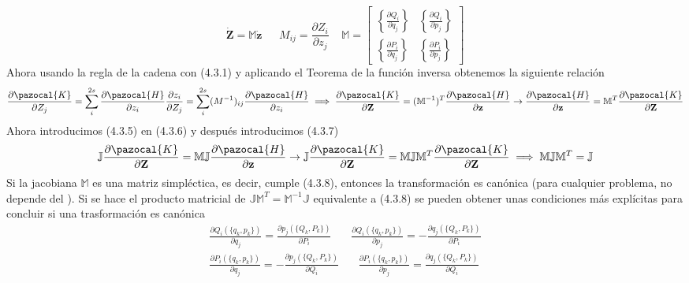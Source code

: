 \begin{equation} \label{4.2.7}
    \dot{\mathbf{Z}} = \mathbb{M}\dot{\mathbf{z}}  \ \ \ \ \ \ \ M_{ij} = \frac{\partial Z_i}{\partial z_j} \ \ \ \ \ \mathbb{M} = \left[\begin{array}{cc} \left\{\frac{\partial Q_i}{\partial q_j}\right\} & \left\{\frac{\partial Q_i}{\partial p_j}\right\} \\  \left\{\frac{\partial P_i}{\partial q_j}\right\} & \left\{\frac{\partial P_i}{\partial p_j}\right\} \end{array}\right]
\end{equation} 
Ahora usando la regla de la cadena con (4.3.1) y aplicando el Teorema de la función inversa obtenemos la siguiente relación 
\begin{equation} \label{4.2.7}
    \frac{\partial \pazocal{K}}{\partial Z_j} = \sum_i^{2s} \frac{\partial \pazocal{H}}{\partial z_i} \frac{\partial z_i}{\partial Z_j} = \sum_i^{2s} ({M^{-1}})_{ij} \frac{\partial \pazocal{H}}{\partial z_i} \implies \frac{\partial \pazocal{K}}{\partial \mathbf{Z}} = (\mathbb{M}^{-1})^T \frac{\partial \pazocal{H}}{\partial \mathbf{z}} \rightarrow  \frac{\partial \pazocal{H}}{\partial \mathbf{z}}  = \mathbb{M}^T \frac{\partial \pazocal{K}}{\partial \mathbf{Z}}
\end{equation} 
Ahora introducimos (4.3.5) en (4.3.6) y después introducimos (4.3.7)
\begin{equation} \label{4.2.7}
    \mathbb{J} \frac{\partial \pazocal{K}}{\partial \mathbf{Z}} = \mathbb{M}\mathbb{J} \frac{\partial \pazocal{H}}{\partial \mathbf{z}} \rightarrow \mathbb{J} \frac{\partial \pazocal{K}}{\partial \mathbf{Z}} = \mathbb{M}\mathbb{J} \mathbb{M}^T \frac{\partial \pazocal{K}}{\partial \mathbf{Z}} \implies \mathbb{M}\mathbb{J} \mathbb{M}^T = \mathbb{J} 
\end{equation} 
Si la jacobiana $\mathbb{M}$ es una matriz simpléctica, es decir, cumple (4.3.8), entonces la transformación es canónica (para cualquier problema, no depende del ).
\newpage
Si se hace el producto matricial de $\mathbb{J} \mathbb{M}^T = \mathbb{M}^{-1}\mathbb{J}$ equivalente a (4.3.8) se pueden obtener unas condiciones más explícitas para concluir si una trasformación es canónica
\begin{equation} \label{4.2.7}
    \begin{split}
        \frac{\partial Q_i(\{q_k,p_k\})}{\partial q_j} = \frac{\partial p_j(\{Q_k,P_k\})}{\partial P_i} \ \ \ \ \ \ \ \ \frac{\partial Q_i(\{q_k,p_k\})}{\partial p_j} = -\frac{\partial q_j(\{Q_k,P_k\})}{\partial P_i} \\ 
        \frac{\partial P_i(\{q_k,p_k\})}{\partial q_j} = -\frac{\partial p_j(\{Q_k,P_k\})}{\partial Q_i} \ \ \ \ \ \ \ \ \frac{\partial P_i(\{q_k,p_k\})}{\partial p_j} = \frac{\partial q_j(\{Q_k,P_k\})}{\partial Q_i}
    \end{split}
\end{equation} 
